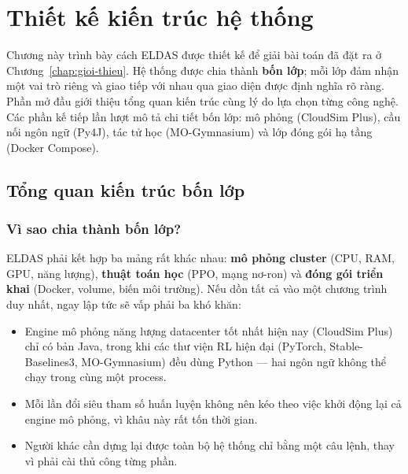 \chapter{Thiết kế kiến trúc hệ thống}
\label{chap:kien-truc}

Chương này trình bày cách ELDAS được thiết kế để giải bài toán đã đặt ra
ở Chương~\ref{chap:gioi-thieu}. Hệ thống được chia thành \textbf{bốn
lớp}; mỗi lớp đảm nhận một vai trò riêng và giao tiếp với nhau qua giao
diện được định nghĩa rõ ràng. Phần mở đầu giới thiệu tổng quan kiến
trúc cùng lý do lựa chọn từng công nghệ. Các phần kế tiếp lần lượt mô
tả chi tiết bốn lớp: mô phỏng (CloudSim Plus), cầu nối ngôn ngữ (Py4J),
tác tử học (MO-Gymnasium) và lớp đóng gói hạ tầng (Docker Compose).

\section{Tổng quan kiến trúc bốn lớp}
\label{sec:tong-quan-kien-truc}

\subsection{Vì sao chia thành bốn lớp?}
ELDAS phải kết hợp ba mảng rất khác nhau: \textbf{mô phỏng cluster}
(CPU, RAM, GPU, năng lượng), \textbf{thuật toán học} (PPO, mạng nơ-ron)
và \textbf{đóng gói triển khai} (Docker, volume, biến môi trường). Nếu
dồn tất cả vào một chương trình duy nhất, ngay lập tức sẽ vấp phải ba
khó khăn:
\begin{itemize}
  \item Engine mô phỏng năng lượng datacenter tốt nhất hiện nay
        (CloudSim Plus) chỉ có bản Java, trong khi các thư viện RL hiện
        đại (PyTorch, Stable-Baselines3, MO-Gymnasium) đều dùng
        Python --- hai ngôn ngữ không thể chạy trong cùng một process.
  \item Mỗi lần đổi siêu tham số huấn luyện không nên kéo theo việc
        khởi động lại cả engine mô phỏng, vì khâu này rất tốn thời gian.
  \item Người khác cần dựng lại được toàn bộ hệ thống chỉ bằng một câu
        lệnh, thay vì phải cài thủ công từng phần.
\end{itemize}

